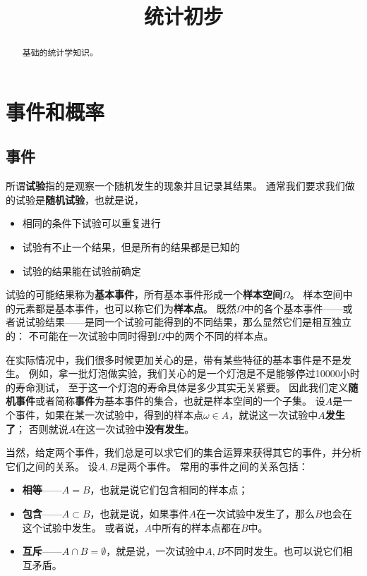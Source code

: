 \documentclass[UTF8, a4paper]{ctexart}
\title{统计初步}
\begin{document}
\maketitle

\begin{abstract}
    基础的统计学知识。
\end{abstract}

\section{事件和概率}

\subsection{事件}

所谓\textbf{试验}指的是观察一个随机发生的现象并且记录其结果。
通常我们要求我们做的试验是\textbf{随机试验}，也就是说，
\begin{itemize}
    \item 相同的条件下试验可以重复进行
    \item 试验有不止一个结果，但是所有的结果都是已知的
    \item 试验的结果能在试验前确定
\end{itemize}
试验的可能结果称为\textbf{基本事件}，所有基本事件形成一个\textbf{样本空间}$\Omega$。
样本空间中的元素都是基本事件，也可以称它们为\textbf{样本点}。
既然$\Omega$中的各个基本事件——或者说试验结果——是同一个试验可能得到的不同结果，那么显然它们是相互独立的：
不可能在一次试验中同时得到$\Omega$中的两个不同的样本点。

在实际情况中，我们很多时候更加关心的是，带有某些特征的基本事件是不是发生。
例如，拿一批灯泡做实验，我们关心的是一个灯泡是不是能够停过10000小时的寿命测试，
至于这一个灯泡的寿命具体是多少其实无关紧要。
因此我们定义\textbf{随机事件}或者简称\textbf{事件}为基本事件的集合，也就是样本空间的一个子集。
设$A$是一个事件，如果在某一次试验中，得到的样本点$\omega \in A$，就说这一次试验中$A$\textbf{发生了}；
否则就说$A$在这一次试验中\textbf{没有发生}。

当然，给定两个事件，我们总是可以求它们的集合运算来获得其它的事件，并分析它们之间的关系。
设$A,B$是两个事件。
常用的事件之间的关系包括：
\begin{itemize}
    \item \textbf{相等}——$A=B$，也就是说它们包含相同的样本点；
    \item \textbf{包含}——$A \subset B$，也就是说，如果事件$A$在一次试验中发生了，那么$B$也会在这个试验中发生。
    或者说，$A$中所有的样本点都在$B$中。
    \item \textbf{互斥}——$A \cap B = \emptyset$，就是说，一次试验中$A, B$不同时发生。也可以说它们相互矛盾。
\end{itemize}
\end{document}
